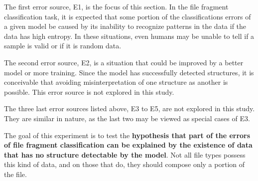 The first error source, E1, is the focus of this section. In the file fragment classification task, it is expected that some portion of the classifications errors of a given model be caused by its inability to recognize patterns in the data if the data has high entropy. In these situations, even humans may be unable to tell if a sample is valid or if it is random data.

The second error source, E2, is a situation that could be improved by a better model or more training. Since the model has successfully detected structures, it is conceivable that avoiding misinterpretation of one structure as another is possible. This error source is not explored in this study.

The three last error sources listed above, E3 to E5, are not explored in this study. They are similar in nature, as the last two may be viewed as special cases of E3. 

The goal of this experiment is to test the \textbf{hypothesis that part of the errors of file fragment classification can be explained by the existence of data that has no structure detectable by the model}. Not all file types possess this kind of data, and on those that do, they should compose only a portion of the file.

